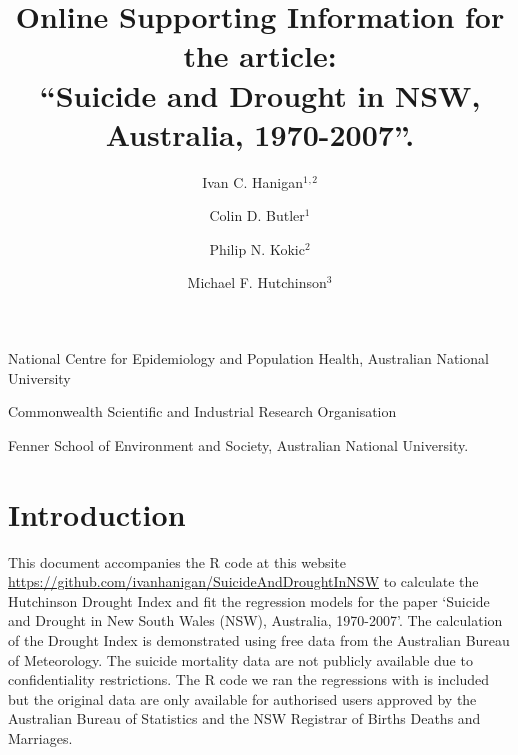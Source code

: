 \documentclass[a4paper]{article}                %
\begin{document}

\title{Online Supporting Information for the article:\\ ``Suicide and Drought in NSW, Australia, 1970-2007''.}
\author{Ivan C. Hanigan$^1$$^,$$^2$ \and Colin D. Butler$^1$ \and
  Philip N. Kokic$^2$ \and
  Michael F. Hutchinson$^3$}
\date{}
\maketitle


\noindent [$^1$]National Centre for Epidemiology and Population Health, Australian National University


\noindent [$^2$]Commonwealth Scientific and Industrial Research Organisation

\noindent [$^3$]Fenner School of Environment and Society, Australian National University.



\setcounter{page}{1}
\tableofcontents
{}
\setcounter{page}{1}

\doublespacing   %




\section{Introduction}

        This document accompanies the R code at this website \url{https://github.com/ivanhanigan/SuicideAndDroughtInNSW} to calculate the Hutchinson Drought Index and fit the regression models for the paper `Suicide and Drought in New South Wales (NSW), Australia, 1970-2007'.  The calculation of the Drought Index is demonstrated using free data from the Australian Bureau of Meteorology. The suicide mortality data are not publicly available due to confidentiality restrictions. The R code we ran the regressions with is included but the original data are only available for authorised users approved by the Australian Bureau of Statistics and the NSW Registrar of Births Deaths and Marriages.


\end{document}
